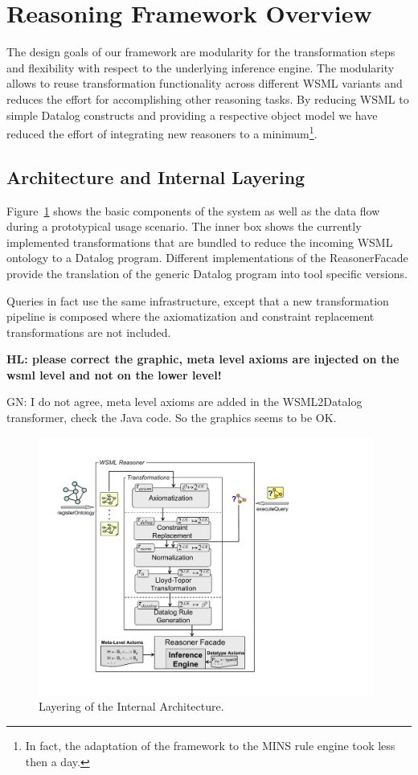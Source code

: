 \section{Reasoning Framework Overview\label{sec:framework}}

The design goals of our framework are modularity for the
transformation steps and flexibility with respect to the
underlying inference engine. The modularity allows to reuse
transformation functionality across different WSML variants and
reduces the effort for accomplishing other reasoning tasks. By
reducing WSML to simple Datalog constructs and providing a
respective object model we have reduced the effort of integrating
new reasoners to a minimum\footnote{In fact, the adaptation of the
framework to the MINS rule engine took less then a day.}.

\subsection{Architecture and Internal Layering}
Figure~\ref{fig:layering} shows the basic components of the system
 as well as the
data flow during a prototypical usage scenario. The inner box
shows the currently implemented transformations that are bundled
to reduce the incoming WSML ontology to a Datalog program.
Different implementations of the ReasonerFacade provide the
translation of the generic Datalog program into tool specific
versions.

Queries in fact use the same infrastructure, except that a new transformation pipeline is
composed where the axiomatization and constraint replacement transformations are not included.

{\bf HL: please correct the graphic, meta level axioms are injected
on the wsml level and not on the lower level!

GN: I do not agree, meta level axioms are added in the WSML2Datalog transformer, check the Java code. So the graphics seems to be OK.}

\begin{figure}[h]
    \includegraphics[width=11cm]{figures/layering}
    \centering
    \caption{Layering of the Internal Architecture. \label{fig:layering}}
\end{figure}


